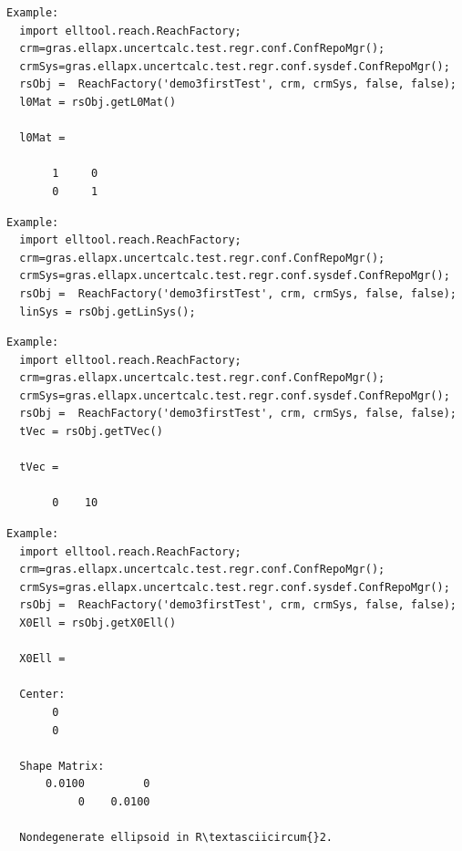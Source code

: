 \documentclass[letterpaper,10pt,english]{sphinxmanual}
\begin{document}
\begin{Verbatim}[commandchars=\\\{\}]
Example:
  import elltool.reach.ReachFactory;
  crm=gras.ellapx.uncertcalc.test.regr.conf.ConfRepoMgr();
  crmSys=gras.ellapx.uncertcalc.test.regr.conf.sysdef.ConfRepoMgr();
  rsObj =  ReachFactory('demo3firstTest', crm, crmSys, false, false);
  l0Mat = rsObj.getL0Mat()

  l0Mat =

       1     0
       0     1
\end{Verbatim}

\begin{Verbatim}[commandchars=\\\{\}]
Example:
  import elltool.reach.ReachFactory;
  crm=gras.ellapx.uncertcalc.test.regr.conf.ConfRepoMgr();
  crmSys=gras.ellapx.uncertcalc.test.regr.conf.sysdef.ConfRepoMgr();
  rsObj =  ReachFactory('demo3firstTest', crm, crmSys, false, false);
  linSys = rsObj.getLinSys();
\end{Verbatim}

\begin{Verbatim}[commandchars=\\\{\}]
Example:
  import elltool.reach.ReachFactory;
  crm=gras.ellapx.uncertcalc.test.regr.conf.ConfRepoMgr();
  crmSys=gras.ellapx.uncertcalc.test.regr.conf.sysdef.ConfRepoMgr();
  rsObj =  ReachFactory('demo3firstTest', crm, crmSys, false, false);
  tVec = rsObj.getTVec()

  tVec =

       0    10
\end{Verbatim}

\begin{Verbatim}[commandchars=\\\{\}]
Example:
  import elltool.reach.ReachFactory;
  crm=gras.ellapx.uncertcalc.test.regr.conf.ConfRepoMgr();
  crmSys=gras.ellapx.uncertcalc.test.regr.conf.sysdef.ConfRepoMgr();
  rsObj =  ReachFactory('demo3firstTest', crm, crmSys, false, false);
  X0Ell = rsObj.getX0Ell()

  X0Ell =

  Center:
       0
       0

  Shape Matrix:
      0.0100         0
           0    0.0100

  Nondegenerate ellipsoid in R\textasciicircum{}2.
\end{Verbatim}
\end{document}
